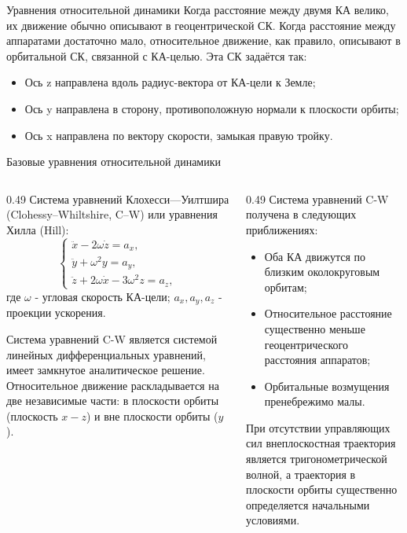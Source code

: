 \documentclass[8pt]{beamer}
\begin{document}
\begin{frame}{Уравнения относительной динамики}
Когда расстояние между двумя КА велико, их движение обычно описывают в геоцентрической СК. Когда расстояние между аппаратами достаточно мало, относительное движение, как правило, описывают в орбитальной СК, связанной с КА-целью. Эта СК задаётся так:
\begin{itemize}
    \item Ось z направлена вдоль радиус-вектора от КА-цели к Земле;
    \item Ось y направлена в сторону, противоположную нормали к плоскости орбиты;
    \item Ось x направлена по вектору скорости, замыкая правую тройку.
\end{itemize}
\end{frame}

\begin{frame}{Базовые уравнения относительной динамики}
\begin{columns}[T,totalwidth=\textwidth]
  \begin{column}{0.49\textwidth}
    Система уравнений Клохесси—Уилтшира (Clohessy–Whiltshire, C–W) или уравнения Хилла (Hill):
    \begin{equation*}
        \begin{cases}
            \ddot{x} - 2 \omega \dot{z} = a_x, \\
            \ddot{y} + \omega^2 y = a_y, \\
            \ddot{z} + 2 \omega \dot{x} - 3 \omega^2 z = a_z, 
        \end{cases}
    \end{equation*}
    где $\omega$ - угловая скорость КА-цели; $a_x, a_y, a_z$ - проекции ускорения.

    Система уравнений C-W является системой линейных дифференциальных уравнений, имеет замкнутое аналитическое решение. Относительное движение раскладывается на две независимые части: в плоскости орбиты (плоскость $x-z$) и вне плоскости орбиты ($y$). 
  \end{column}

  \begin{column}{0.49\textwidth}
    Система уравнений C-W получена в следующих приближениях:
    \begin{itemize}
        \item Оба КА движутся по близким околокруговым орбитам;
        \item Относительное расстояние существенно меньше геоцентрического расстояния аппаратов;
        \item Орбитальные возмущения пренебрежимо малы.
    \end{itemize}

    При отсутствии управляющих сил внеплоскостная траектория является тригонометрической волной, а траектория в плоскости орбиты существенно определяется начальными условиями.
  \end{column}
\end{columns}
\end{frame}
\end{document}
